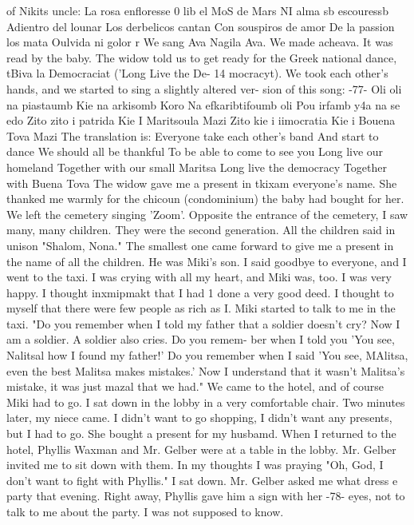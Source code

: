 of Nikits uncle: 
La rosa enfloresse 
0 lib el MoS de Mars 
NI alma sb escouressb 
Adientro del lounar 
Los derbelicos cantan 
Con souspiros de amor 
De la passion los mata 
Oulvida ni golor 
r 
We sang Ava Nagila Ava.
We made acheava.
It was read by the baby.
The widow told 
us to get ready for the Greek national dance, tBiva la Democraciat ('Long Live the De- 14 
mocracyt).
We took each other's hands, and we started to sing a slightly altered ver-
sion of this song: 
-77- 
Oli oli na piastaumb 
Kie na arkisomb Koro 
Na efkaribtifoumb oli 
Pou irfamb y4a na se edo 
Zito zito i patrida 
Kie I Maritsoula Mazi 
Zito kie i iimocratia 
Kie i Bouena Tova Mazi 
The translation is: 
Everyone take each other's band 
And start to dance 
We should all be thankful 
To be able to come to see you 
Long live our homeland 
Together with our small Maritsa 
Long live the democracy 
Together with Buena Tova 
The widow gave me a present in tkixam everyone's name.
She thanked me warmly for 
the chicoun (condominium) the baby had bought for her.
We left the cemetery singing 
'Zoom'.
Opposite the entrance of the cemetery, I saw many, many children.
They were 
the second generation.
All the children said in unison "Shalom, Nona."
The smallest 
one came forward to give me a present in the name of all the children.
He was Miki's 
son.
I said goodbye to everyone, and I went to the taxi.
I was crying with all my 
heart, and Miki was, too.
I was very happy.
I thought inxmipmakt that I had 1 done a 
very good deed.
I thought to myself that there were few people as rich as I. 
Miki started to talk to me in the taxi.
"Do you remember when I told my father 
that a soldier doesn't cry?
Now I am a soldier.
A soldier also cries.
Do you remem-
ber when I told you 'You see, Nalitsal how I found my father!'
Do you remember when I 
said 'You see, MAlitsa, even the best Malitsa makes mistakes.'
Now I understand that it 
wasn't Malitsa's mistake, it was just mazal that we had."
We came to the hotel, and of course Miki had to go.
I sat down in the lobby in a 
very comfortable chair.
Two minutes later, my niece came.
I didn't want to go shopping, 
I didn't want any presents, but I had to go.
She bought a present for my husbamd.
When I returned to the hotel, Phyllis Waxman and Mr.
Gelber were at a table in the 
lobby.
Mr.
Gelber invited me to sit down with them.
In my thoughts I was praying "Oh, 
God, I don't want to fight with Phyllis."
I sat down.
Mr.
Gelber asked me what dress 
e party that 
evening.
Right away, Phyllis gave him a sign with her 
-78- 
eyes, not to talk to me about the party.
I was not supposed to know.
